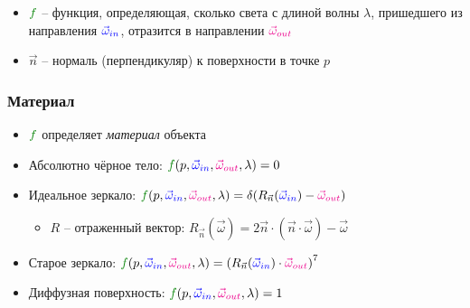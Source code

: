\documentclass[10pt]{beamer}
\begin{document}
\begin{frame}[fragile]
\begin{itemize}
\pause
\item \begin{math}{\color{green}f}\end{math} -- функция, определяющая, сколько света с длиной волны \begin{math}\lambda\end{math}, пришедшего из направления \begin{math}{\color{blue}\vec\omega_{in}}\end{math}, отразится в направлении \begin{math}{\color{magenta}\vec\omega_{out}}\end{math}
\pause
\item \begin{math}\vec n\end{math} -- нормаль (перпендикуляр) к поверхности в точке \begin{math}p\end{math}
\end{itemize}
\end{frame}

\begin{frame}[fragile]
\frametitle{Материал}
\begin{itemize}
\item \begin{math}{\color{green}f}\end{math} определяет \textit{материал} объекта
\pause 
\item Абсолютно чёрное тело: \begin{math}{\color{green}f}(p, {\color{blue}\vec\omega_{in}}, {\color{magenta}\vec\omega_{out}}, \lambda) = 0\end{math}
\pause
\item Идеальное зеркало: \begin{math}{\color{green}f}(p, {\color{blue}\vec\omega_{in}}, {\color{magenta}\vec\omega_{out}}, \lambda) = \delta({R_{\vec n}(\color{blue}\vec\omega_{in}}) - {\color{magenta}\vec\omega_{out}})\end{math}
\begin{itemize}
\item \begin{math}R\end{math} -- отраженный вектор: \begin{math}R_{\vec n}(\vec \omega) = 2\vec n \cdot (\vec n \cdot \vec \omega) - \vec \omega\end{math}
\end{itemize}
\pause
\item Старое зеркало: \begin{math}{\color{green}f}(p, {\color{blue}\vec\omega_{in}}, {\color{magenta}\vec\omega_{out}}, \lambda) = \left(R_{\vec n}({\color{blue}\vec\omega_{in}})\cdot{\color{magenta}\vec\omega_{out}}\right)^7\end{math}
\pause
\item Диффузная поверхность: \begin{math}{\color{green}f}(p, {\color{blue}\vec\omega_{in}}, {\color{magenta}\vec\omega_{out}}, \lambda) = 1\end{math}
\end{itemize}
\end{frame}
\end{document}
